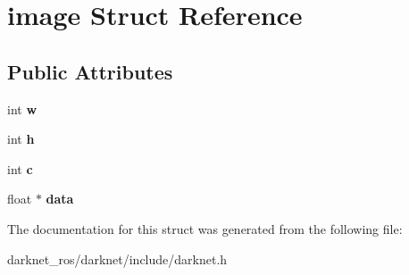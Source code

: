 \hypertarget{structimage}{}\section{image Struct Reference}
\label{structimage}
\subsection*{Public Attributes}
\begin{DoxyCompactItemize}
\item 
\mbox{\label{structimage_aa6480e4024a0d5ca8d36b4145b3ceb43}} 
int {\bfseries w}
\item 
\mbox{\label{structimage_a30e2caee481a59608823b3bcec8a139f}} 
int {\bfseries h}
\item 
\mbox{\label{structimage_aa67d2491c4d17dd240453d69dfc99482}} 
int {\bfseries c}
\item 
\mbox{\label{structimage_aed7e0704080213b735419d6661251a0a}} 
float $\ast$ {\bfseries data}
\end{DoxyCompactItemize}


The documentation for this struct was generated from the following file\+:\begin{DoxyCompactItemize}
\item 
darknet\+\_\+ros/darknet/include/darknet.\+h\end{DoxyCompactItemize}
